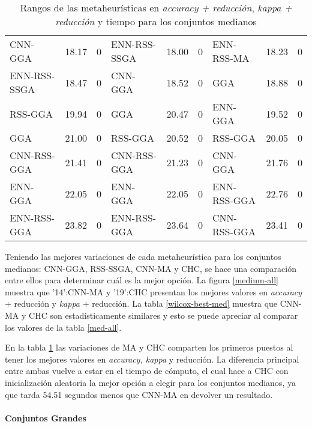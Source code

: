 \begin{table}[h!]
\begin{adjustbox}{max width =\textwidth}
\begin{tabular}{l c c|l c c|l c c}
CNN-GGA      & 18.17 & 0 & ENN-RSS-SSGA & 18.00 & 0  &  ENN-RSS-MA   & 18.23 & 0 \\
ENN-RSS-SSGA & 18.47 & 0 & CNN-GGA      & 18.52 & 0  &  GGA          & 18.88 & 0 \\
RSS-GGA      & 19.94 & 0 & GGA          & 20.47 & 0  &  ENN-GGA      & 19.52 & 0 \\
GGA          & 21.00 & 0 & RSS-GGA      & 20.52 & 0  &  RSS-GGA      & 20.05 & 0 \\
CNN-RSS-GGA  & 21.41 & 0 & CNN-RSS-GGA  & 21.23 & 0  &  CNN-GGA      & 21.76 & 0 \\
ENN-GGA      & 22.05 & 0 & ENN-GGA      & 22.05 & 0  &  ENN-RSS-GGA  & 22.76 & 0 \\
ENN-RSS-GGA  & 23.82 & 0 & ENN-RSS-GGA  & 23.64 & 0  &  CNN-RSS-GGA  & 23.41 & 0 \\ 

\hline
\end{tabular}
\end{adjustbox}
\caption{Rangos de las metaheurísticas en \emph{accuracy + reducción}, \emph{kappa + reducción} y tiempo para los conjuntos medianos}
\label{rank-med}
\end{table}

Teniendo las mejores variaciones de cada metaheurística para los conjuntos medianos: CNN-GGA, RSS-SSGA, CNN-MA y CHC, se hace una comparación entre ellos para determinar cuál es la mejor opción. La figura \ref{medium-all} muestra que '14':CNN-MA y '19':CHC presentan los mejores valores en \emph{accuracy} + reducción y \emph{kappa} + reducción. La tabla \ref{wilcox-best-med} muestra que CNN-MA y CHC son estadísticamente similares y esto se puede apreciar al comparar los valores de la tabla \ref{med-all}. 

En la tabla \ref{rank-med} las variaciones de MA y CHC comparten los primeros puestos al tener los mejores valores en \emph{accuracy, kappa} y reducción. La diferencia principal entre ambas vuelve a estar en el tiempo de cómputo, el cual hace a CHC con inicialización aleatoria la mejor opción a elegir para los conjuntos medianos, ya que tarda 54.51 segundos menos que CNN-MA en devolver un resultado.


\paragraph{Conjuntos Grandes}

